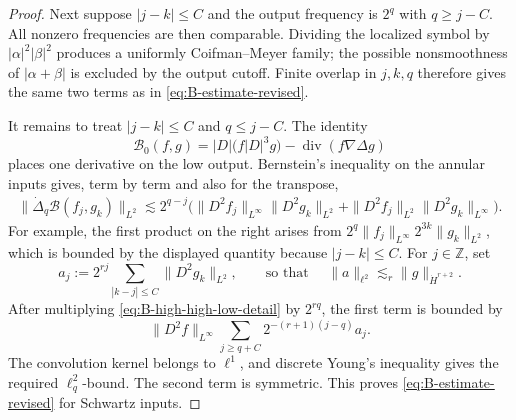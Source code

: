 \documentclass[12pt]{amsart}
\theoremstyle{remark}
\theoremstyle{definition}
\numberwithin{equation}{section}
\begin{document}
\begin{proof}
Next suppose \(|j-k|\leq C\) and the output frequency is \(2^q\) with \(q\geq j-C\).  
All nonzero frequencies are then comparable.  
Dividing the localized symbol by \(|\alpha|^2|\beta|^2\) produces a uniformly
Coifman--Meyer family; the possible nonsmoothness of
\(|\alpha+\beta|\) is excluded by the output cutoff.  Finite overlap in
\(j,k,q\) therefore gives the same two terms as in
\eqref{eq:B-estimate-revised}.

It remains to treat \(|j-k|\leq C\) and \(q\leq j-C\). The identity
\[
 \mathcal B_0(f,g)
 =|D|\bigl(f|D|^3g\bigr)-\operatorname{div}(f\nabla\Delta g)
\]
places one derivative on the low output.  Bernstein's inequality on the
annular inputs gives, term by term and also for the transpose,
\begin{align}
\label{eq:B-high-high-low-detail}
 \|\dot\Delta_q\mathcal B(f_j,g_k)\|_{L^2}
 \lesssim 2^{q-j}\bigl(
 \|D^2f_j\|_{L^\infty}\|D^2g_k\|_{L^2}
 +\|D^2f_j\|_{L^2}\|D^2g_k\|_{L^\infty}\bigr).
\end{align}
For example, the first product on the right arises from
\(2^q\|f_j\|_{L^\infty}2^{3k}\|g_k\|_{L^2}\), which is bounded by the
displayed quantity because \(|j-k|\leq C\).  
For \(j\in\mathbb Z\), set
\[
 a_j:=2^{rj}\sum_{|k-j|\leq C}\|D^2g_k\|_{L^2},
 \qquad \text{so that } \quad\|a\|_{\ell^2}\lesssim_r\|g\|_{\dot H^{r+2}}.
\]
After multiplying \eqref{eq:B-high-high-low-detail} by \(2^{rq}\), the
first term is bounded by
\[
 \|D^2f\|_{L^\infty}
 \sum_{j\geq q+C}2^{-(r+1)(j-q)}a_j.
\]
The convolution kernel belongs to \(\ell^1\), and discrete Young's
inequality gives the required \(\ell^2_q\)-bound.  
The second term is symmetric.  
This proves \eqref{eq:B-estimate-revised} for Schwartz inputs.


\end{proof}
\end{document}
